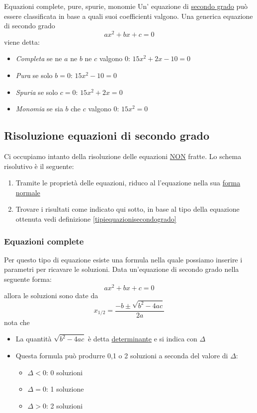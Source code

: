 \begin{definizione}{Equazioni complete, pure, spurie, monomie}
	Un' equazione di \underline{secondo grado} può essere classificata in base a quali suoi coefficienti valgono. Una generica equazione di secondo grado
	\[
		ax^2  + bx + c = 0
	\]
	viene detta:
	\begin{itemize}
		\item \textit{Completa} se ne $ a $ ne $ b $ ne $ c $ valgono 0: $ 15x^2  + 2x -10 = 0  $
		\item \textit{Pura} se solo $ b = 0 $: $ 15x^2  - 10 = 0 $
		\item \textit{Spuria} se solo $ c = 0 $: $ 15x^2 +2x = 0  $
		\item \textit{Monomia} se sia $ b $ che $ c $ valgono 0: $ 15x^2 = 0 $
	\end{itemize}
\end{definizione}\label{tipiequazionisecondogrado}

\subsection{Risoluzione equazioni di secondo grado}
Ci occupiamo intanto della risoluzione delle equazioni \underline{NON} fratte. Lo schema risolutivo è il seguente:
\begin{enumerate}
	\item Tramite le proprietà delle equazioni, riduco al l'equazione nella sua \underline{forma normale}
	\item Trovare i risultati come indicato qui sotto, in base al tipo della equazione ottenuta vedi definizione \ref{tipiequazionisecondogrado}
\end{enumerate}
\subsubsection{Equazioni complete}
Per questo tipo di equazione esiste una formula nella quale possiamo inserire i parametri per ricavare le soluzioni. Data un'equazione di secondo grado nella seguente forma:
\[
	ax^2  + bx + c = 0
\]
allora le soluzioni sono date da
\[
	x_{1/2} = \frac{-b \pm \sqrt{b^2  - 4 ac}}{2a}
\]
nota che
\begin{itemize}
	\item La quantità $ \sqrt{b^2  - 4ac} $ è detta \underline{determinante} e si indica con $ \Delta  $
	\item Questa formula può produrre 0,1 o 2 soluzioni a seconda del valore di $ \Delta  $:
	      \begin{itemize}
		      \item $ \Delta < 0 $: 0 soluzioni
		      \item $ \Delta = 0 $: 1 soluzione
		      \item $ \Delta > 0 $: 2 soluzioni
	      \end{itemize}
\end{itemize}
